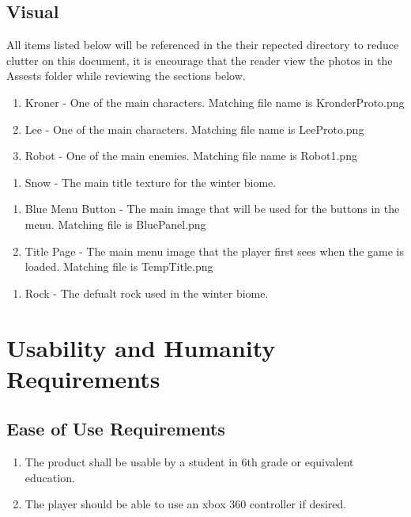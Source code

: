 \documentclass{article}
\begin{document}
\subsection{Visual}
\quad All items listed below will be referenced in the their repected directory to reduce clutter on this document, it is encourage that the reader view the photos in the Assests folder while reviewing the sections below.
\begin{enumerate}[{Sprite}1.]
	\item Kroner - One of the main characters. Matching file name is KronderProto.png
	\item Lee - One of the main characters. Matching file name is LeeProto.png
	\item Robot - One of the main enemies. Matching file name is  Robot1.png
\end{enumerate}
\begin{enumerate}[{Texture}1.]
	\item Snow - The main title texture for the winter biome. %
\end{enumerate}
\begin{enumerate}[{UI}1.]
	\item Blue Menu Button - The main image that will be used for the buttons in the menu. Matching file is BluePanel.png
	\item Title Page - The main menu image that the player first sees when the game is loaded. Matching file is TempTitle.png
\end{enumerate}
\begin{enumerate}[{Enviroment}1.]
	\item Rock - The defualt rock used in the winter biome. %
\end{enumerate}
\section{Usability and Humanity Requirements}
\subsection{Ease of Use Requirements}
\begin{enumerate}[{EUR}1. ]
	\item The product shall be usable by a student in 6th grade or equivalent education.
	\item The player should be able to use an xbox 360 controller if desired.
\end{enumerate}
\end{document}
